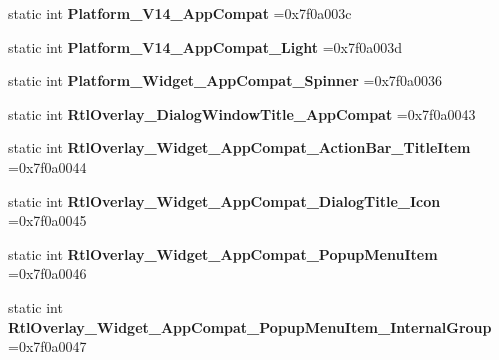 \begin{DoxyCompactItemize}
static int {\bfseries Platform\+\_\+\+V14\+\_\+\+App\+Compat} =0x7f0a003c
\item 
\mbox{\label{classandroid_1_1support_1_1v7_1_1mediarouter_1_1R_1_1style_a1ab51977b75ef471dfb07582de277dcc}} 
static int {\bfseries Platform\+\_\+\+V14\+\_\+\+App\+Compat\+\_\+\+Light} =0x7f0a003d
\item 
\mbox{\label{classandroid_1_1support_1_1v7_1_1mediarouter_1_1R_1_1style_aa6269c84df61713c3ee0e5e20805e25b}} 
static int {\bfseries Platform\+\_\+\+Widget\+\_\+\+App\+Compat\+\_\+\+Spinner} =0x7f0a0036
\item 
\mbox{\label{classandroid_1_1support_1_1v7_1_1mediarouter_1_1R_1_1style_af9c32a440ce1dfcdc2a1c6e127ab712f}} 
static int {\bfseries Rtl\+Overlay\+\_\+\+Dialog\+Window\+Title\+\_\+\+App\+Compat} =0x7f0a0043
\item 
\mbox{\label{classandroid_1_1support_1_1v7_1_1mediarouter_1_1R_1_1style_a573c1ec652c1b2f4f50154a9baaea70d}} 
static int {\bfseries Rtl\+Overlay\+\_\+\+Widget\+\_\+\+App\+Compat\+\_\+\+Action\+Bar\+\_\+\+Title\+Item} =0x7f0a0044
\item 
\mbox{\label{classandroid_1_1support_1_1v7_1_1mediarouter_1_1R_1_1style_aefce98cafd476720ea30faa5ca561312}} 
static int {\bfseries Rtl\+Overlay\+\_\+\+Widget\+\_\+\+App\+Compat\+\_\+\+Dialog\+Title\+\_\+\+Icon} =0x7f0a0045
\item 
\mbox{\label{classandroid_1_1support_1_1v7_1_1mediarouter_1_1R_1_1style_a4cd6a75899d7150f4894375d0d72a944}} 
static int {\bfseries Rtl\+Overlay\+\_\+\+Widget\+\_\+\+App\+Compat\+\_\+\+Popup\+Menu\+Item} =0x7f0a0046
\item 
\mbox{\label{classandroid_1_1support_1_1v7_1_1mediarouter_1_1R_1_1style_a75326b01c766feac1c045edd23489a0c}} 
static int {\bfseries Rtl\+Overlay\+\_\+\+Widget\+\_\+\+App\+Compat\+\_\+\+Popup\+Menu\+Item\+\_\+\+Internal\+Group} =0x7f0a0047

\end{DoxyCompactItemize}
